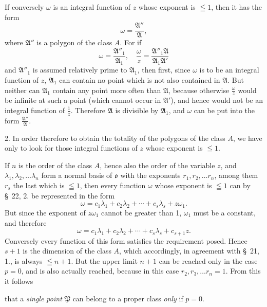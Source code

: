 \documentclass{article}
\begin{document}
If conversely $\omega$ is an integral function of $z$ whose exponent is $\leqq 1$, then it has the form
\[ \omega = \frac{\mathfrak{A}''}{\mathfrak{A}}, \]
where $\mathfrak{A}''$ is a polygon of the class $A$. For if
\[ \omega = \frac{\mathfrak{A}''_{1}}{\mathfrak{A}_{1}}, \quad \frac{\omega}{z} = \frac{\mathfrak{A}''_{1}\mathfrak{A}}{\mathfrak{A}_{1}\mathfrak{A}'} \]
and $\mathfrak{A}''_{1}$ is assumed relatively prime to $\mathfrak{A}_{1}$, then first, since $\omega$ is to be an integral function of $z$, $\mathfrak{A}_{1}$ can contain no point which is not also contained in $\mathfrak{A}$. But neither can $\mathfrak{A}_{1}$ contain any point more often than $\mathfrak{A}$, because otherwise $\frac{\omega}{z}$ would be infinite at such a point (which cannot occur in $\mathfrak{A}'$), and hence would not be an integral function of $\frac{1}{z}$. Therefore $\mathfrak{A}$ is divisible by $\mathfrak{A}_{1}$, and $\omega$ can be put into the form $\frac{\mathfrak{A}''}{\mathfrak{A}}$.

2. In order therefore to obtain the totality of the polygons of the class $A$, we have only to look for those integral functions of $z$ whose exponent is $\leqq 1$.

If $n$ is the order of the class $A$, hence also the order of the variable $z$, and $\lambda_{1}, \lambda_{2}, \ldots \lambda_{n}$ form a normal basis of $\mathfrak{o}$ with the exponents $r_{1}, r_{2}, \ldots r_{n}$, among them $r_{s}$ the last which is $\leqq 1$, then every function $\omega$ whose exponent is $\leqq 1$ can by §~22, 2. be represented in the form
\[ \omega = c_{1}\lambda_{1} + c_{2}\lambda_{2} + \cdots + c_{s}\lambda_{s} + z\omega_{1}. \]
But since the exponent of $z\omega_{1}$ cannot be greater than 1, $\omega_{1}$ must be a constant, and therefore
\[ \omega = c_{1}\lambda_{1} + c_{2}\lambda_{2} + \cdots + c_{s}\lambda_{s} + c_{s+1}z. \]
Conversely every function of this form satisfies the requirement posed. Hence $s+1$ is the dimension of the class $A$, which accordingly, in agreement with §~21, 1., is always $\leqq n+1$. But the upper limit $n+1$ can be reached only in the case $p = 0$, and is also actually reached, because in this case $r_{2}, r_{3}, \ldots r_{n} = 1$. From this it follows

that a \emph{single point} $\mathfrak{P}$ can belong to a proper class \emph{only} if $p = 0$.
\end{document}
